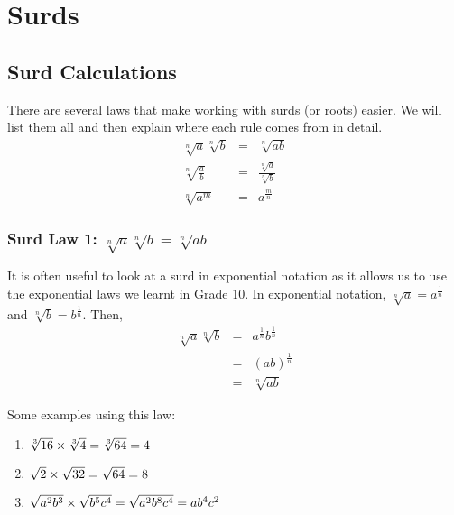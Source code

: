\chapter{Surds}
\label{m:ng11}

\section{Surd Calculations}

There are several laws that make working with surds (or roots) easier. We will list them all and then explain where each rule comes from in detail.
\begin{eqnarray}
\label{eq:mn:s:1}
\sqrt[n]{a}\sqrt[n]{b}&=&\sqrt[n]{ab}\\
\label{eq:mn:s:2}
\sqrt[n]{\frac ab}&=&\frac{\sqrt[n]{a}}{\sqrt[n]{b}}\\
\label{eq:mn:s:3}
\sqrt[n]{a^m}&=&a^{\frac mn}
\end{eqnarray}

\subsection{Surd Law 1: $\sqrt[n]{a}\sqrt[n]{b}=\sqrt[n]{ab}$}
It is often useful to look at a surd in exponential notation as it allows us to use the exponential laws we learnt in Grade 10. In exponential notation, $\sqrt[n]{a}=a^{\frac{1}{n}}$ and $\sqrt[n]{b}=b^{\frac{1}{n}}$. Then,
\begin{eqnarray}
\label{eq:mn:s:1:exp}
\sqrt[n]{a}\sqrt[n]{b}&=&a^{\frac 1n}b^{\frac 1n}\\ \nonumber
&=&(ab)^{\frac 1n}\\ \nonumber
&=&\sqrt[n]{ab}
\end{eqnarray}

Some examples using this law:
\begin{enumerate}
\item{$\sqrt[3]{16}\times \sqrt[3]{4} \\= \sqrt[3]{64}\\=4$}
\item{$\sqrt{2}\times \sqrt{32}\\=\sqrt{64}\\=8$}
\item{$\sqrt{a^2b^3}\times \sqrt{b^5c^4}\\=\sqrt{a^2b^8c^4}\\= ab^4c^2$}
\end{enumerate}

